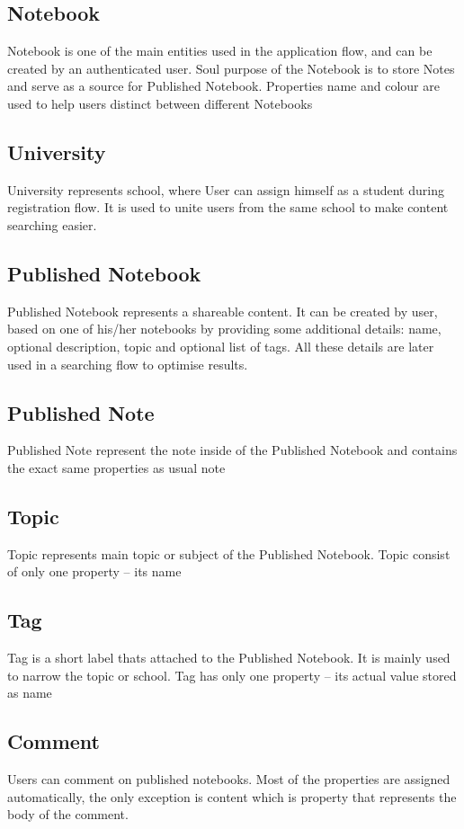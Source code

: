 \documentclass[thesis=B,english]{FITthesis}[2012/10/20]
\begin{document}
\subsection{Notebook}
	Notebook is one of the main entities used in the application flow, and  can be created by an authenticated user. Soul purpose of the Notebook is to store Notes and serve as a source for Published Notebook. Properties name and colour are used to help users distinct between different Notebooks
	
	
\subsection{University}
University represents school, where User can assign himself as a student during registration flow. It is used to unite users from the same school to make content searching easier. 

\subsection{Published Notebook}
Published Notebook represents a shareable content. It can be created by user, based on one of his/her notebooks by providing some additional details:
name, optional description,  topic and optional list of tags. All these details are later used in a searching flow to optimise results.

\subsection{Published Note}
Published Note represent the note inside of the Published Notebook and contains the exact same properties as usual note

\subsection{Topic}
Topic represents main topic or subject of the Published Notebook. Topic consist of only one property -- its name
\subsection{Tag}
Tag is a short label thats attached to the Published Notebook. It is mainly  used to narrow the topic or school. Tag has only one property -- its actual value stored as name

\subsection{Comment}
Users can comment on published notebooks. Most of the properties are assigned automatically, the only exception is content which is property that represents the body of the comment.
\end{document}
